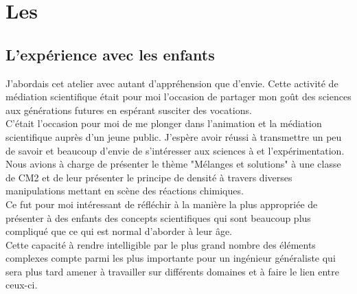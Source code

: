 {\section{Les \pd}

\subsection{L'expérience avec les enfants}

J'abordais cet atelier avec autant d'appréhension que d'envie. Cette activité de médiation scientifique était pour moi l'occasion de partager mon goût des sciences aux générations futures en espérant susciter des vocations.\\
C'était l'occasion pour moi de me plonger dans l'animation et la médiation scientifique auprès d'un jeune public. J'espère avoir réussi à transmettre un peu de savoir et beaucoup d'envie de s'intéresser aux sciences à et l'expérimentation.\\

Nous avions à charge de présenter le thème "Mélanges et solutions" à une classe de CM2 et de leur présenter le principe de densité à travers diverses manipulations mettant en scène des réactions chimiques.\\

Ce fut pour moi intéressant de réfléchir à la manière la plus appropriée de présenter à des enfants des concepts scientifiques qui sont beaucoup plus compliqué que ce qui est normal d'aborder à leur âge.\\
Cette capacité à rendre intelligible par le plus grand nombre des éléments complexes compte parmi les plus importante pour un ingénieur généraliste qui sera plus tard amener à travailler sur différents domaines et à faire le lien entre ceux-ci.\\

}
